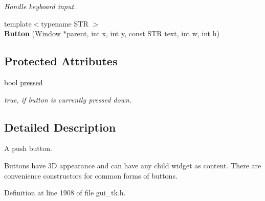 \begin{DoxyCompactItemize}
\begin{DoxyCompactList}\small\item\em Handle keyboard input. \end{DoxyCompactList}\item 
\hypertarget{classGUI_1_1Button_ada8368b22e9bfcfa7ba9199f9ea3f7cc}{{\footnotesize template$<$typename S\-T\-R $>$ }\\{\bfseries Button} (\hyperlink{classGUI_1_1Window}{Window} $\ast$\hyperlink{classGUI_1_1Window_a2e593ff65e7702178d82fe9010a0b539}{parent}, int \hyperlink{classGUI_1_1Window_a6ca6a80ca00c9e1d8ceea8d3d99a657d}{x}, int \hyperlink{classGUI_1_1Window_a0ee8e923aff2c3661fc2e17656d37adf}{y}, const S\-T\-R text, int w, int h)}\label{classGUI_1_1Button_ada8368b22e9bfcfa7ba9199f9ea3f7cc}

\end{DoxyCompactItemize}
\subsection*{Protected Attributes}
\begin{DoxyCompactItemize}
\item 
\hypertarget{classGUI_1_1Button_aec37fa9a4a6ea6d1e0e2788d42d67ee1}{bool \hyperlink{classGUI_1_1Button_aec37fa9a4a6ea6d1e0e2788d42d67ee1}{pressed}}\label{classGUI_1_1Button_aec37fa9a4a6ea6d1e0e2788d42d67ee1}

\begin{DoxyCompactList}\small\item\em {\ttfamily true}, if button is currently pressed down. \end{DoxyCompactList}\end{DoxyCompactItemize}


\subsection{Detailed Description}
A push button. 

Buttons have 3\-D appearance and can have any child widget as content. There are convenience constructors for common forms of buttons. 

Definition at line 1908 of file gui\-\_\-tk.\-h.



